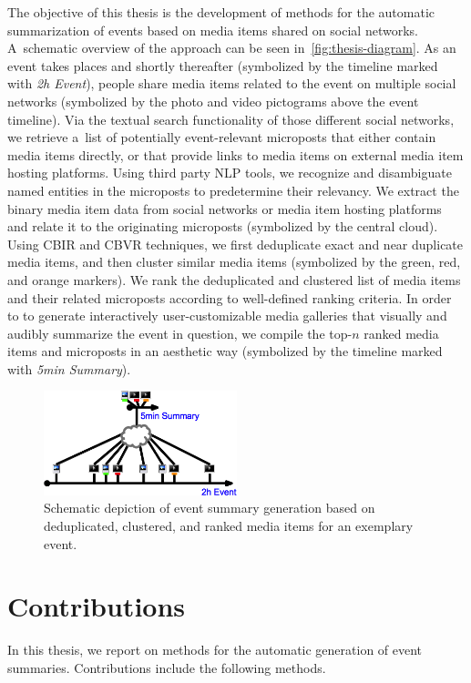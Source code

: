 The objective of this thesis is the development
of methods for the automatic summarization of events
based on media items shared on social networks.
A~schematic overview of the approach can be seen
in~\autoref{fig:thesis-diagram}.
As an event takes places and shortly thereafter
(symbolized by the timeline marked with \emph{2h Event}),
people share media items related to the event
on multiple social networks
(symbolized by the photo and video pictograms
above the event timeline).
Via the textual search functionality of those
different social networks,
we retrieve a~list of potentially event-relevant
microposts that either contain media items directly,
or that provide links to media items
on external media item hosting platforms.
Using third party NLP tools,
we recognize and disambiguate named entities
in the microposts to predetermine their relevancy.
We extract the binary media item data
from social networks or media item hosting platforms
and relate it to the originating microposts
(symbolized by the central cloud).
Using CBIR and CBVR techniques, we first deduplicate
exact and near duplicate media items,
and then cluster similar media items
(symbolized by the green, red, and orange markers).
We rank the deduplicated and clustered list
of media items and their related microposts
according to well-defined ranking criteria.
In order to to generate interactively user-customizable
media galleries that visually and audibly summarize the
event in question, we compile the top-$n$ ranked
media items and microposts in an aesthetic way
(symbolized by the timeline marked with \emph{5min Summary}).

\begin{figure}[h!]
  \centering
  \includegraphics[width=0.5\textwidth]{thesis-diagram.png}
  \caption{Schematic depiction of event summary generation
    based on deduplicated, clustered, and ranked media items
    for an exemplary event.}
  \label{fig:thesis-diagram}
\end{figure}

\section{Contributions}
In this thesis, we report on methods for the automatic generation
of event summaries. Contributions include the following methods.

